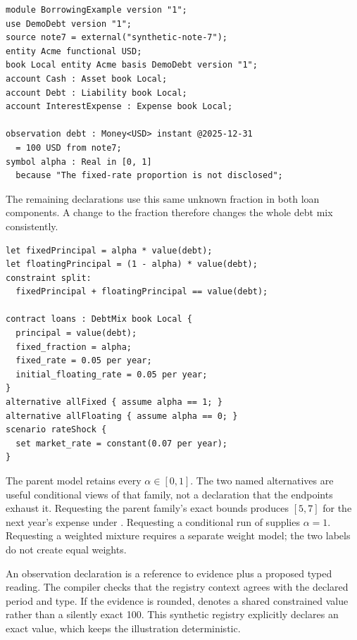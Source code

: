 \begin{lstlisting}
module BorrowingExample version "1";
use DemoDebt version "1";
source note7 = external("synthetic-note-7");
entity Acme functional USD;
book Local entity Acme basis DemoDebt version "1";
account Cash : Asset book Local;
account Debt : Liability book Local;
account InterestExpense : Expense book Local;

observation debt : Money<USD> instant @2025-12-31
  = 100 USD from note7;
symbol alpha : Real in [0, 1]
  because "The fixed-rate proportion is not disclosed";
\end{lstlisting}

The remaining declarations use this same unknown fraction in both loan
components. A change to the fraction therefore changes the whole debt mix
consistently.

\begin{lstlisting}
let fixedPrincipal = alpha * value(debt);
let floatingPrincipal = (1 - alpha) * value(debt);
constraint split:
  fixedPrincipal + floatingPrincipal == value(debt);

contract loans : DebtMix book Local {
  principal = value(debt);
  fixed_fraction = alpha;
  fixed_rate = 0.05 per year;
  initial_floating_rate = 0.05 per year;
}
alternative allFixed { assume alpha == 1; }
alternative allFloating { assume alpha == 0; }
scenario rateShock {
  set market_rate = constant(0.07 per year);
}
\end{lstlisting}

The parent model retains every $\alpha\in[0,1]$. The two named alternatives
are useful conditional views of that family, not a declaration that the
endpoints exhaust it. Requesting the parent family's exact bounds produces
$[5,7]$ for the next year's expense under . Requesting a
conditional run of  supplies $\alpha=1$. Requesting a weighted
mixture requires a separate weight model; the two labels do not create equal
weights.

An observation declaration is a reference to evidence plus a proposed typed
reading. The compiler checks that the registry context agrees with the declared
period and type. If the evidence is rounded,  denotes a
shared constrained value rather than a silently exact 100. This synthetic
registry explicitly declares an exact value, which keeps the illustration
deterministic.

